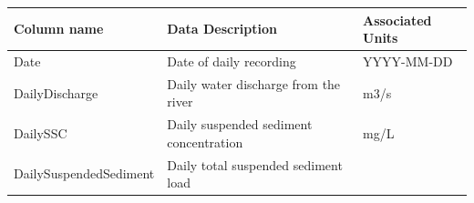 \documentclass[12pt,]{article}
\begin{document}
\begin{longtable}[]{@{}lll@{}}
\toprule
\begin{minipage}[b]{0.30\columnwidth}\raggedright
Column name\strut
\end{minipage} & \begin{minipage}[b]{0.46\columnwidth}\raggedright
Data Description\strut
\end{minipage} & \begin{minipage}[b]{0.16\columnwidth}\raggedright
Associated Units\strut
\end{minipage}\tabularnewline
\midrule
\endhead
\begin{minipage}[t]{0.30\columnwidth}\raggedright
Date\strut
\end{minipage} & \begin{minipage}[t]{0.46\columnwidth}\raggedright
Date of daily recording\strut
\end{minipage} & \begin{minipage}[t]{0.16\columnwidth}\raggedright
YYYY-MM-DD\strut
\end{minipage}\tabularnewline
\begin{minipage}[t]{0.30\columnwidth}\raggedright
DailyDischarge\strut
\end{minipage} & \begin{minipage}[t]{0.46\columnwidth}\raggedright
Daily water discharge from the river\strut
\end{minipage} & \begin{minipage}[t]{0.16\columnwidth}\raggedright
m3/s\strut
\end{minipage}\tabularnewline
\begin{minipage}[t]{0.30\columnwidth}\raggedright
DailySSC\strut
\end{minipage} & \begin{minipage}[t]{0.46\columnwidth}\raggedright
Daily suspended sediment concentration\strut
\end{minipage} & \begin{minipage}[t]{0.16\columnwidth}\raggedright
mg/L\strut
\end{minipage}\tabularnewline
\begin{minipage}[t]{0.30\columnwidth}\raggedright
DailySuspendedSediment\strut
\end{minipage} & \begin{minipage}[t]{0.46\columnwidth}\raggedright
Daily total suspended sediment load\strut
\end{minipage} & \begin{minipage}[t]{0.16\columnwidth}\raggedright

\end{minipage}
\end{longtable}
\end{document}
